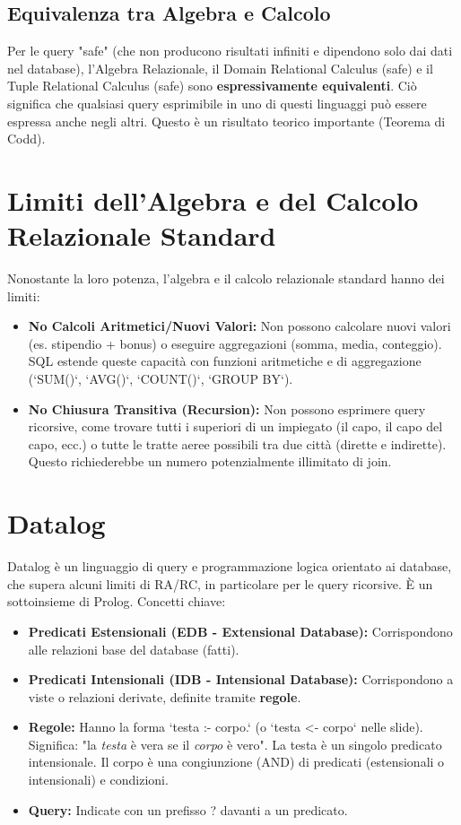 \documentclass{article}
\begin{document}
	\subsection{Equivalenza tra Algebra e Calcolo}
	Per le query "safe" (che non producono risultati infiniti e dipendono solo dai dati nel database), l'Algebra Relazionale, il Domain Relational Calculus (safe) e il Tuple Relational Calculus (safe) sono \textbf{espressivamente equivalenti}. Ciò significa che qualsiasi query esprimibile in uno di questi linguaggi può essere espressa anche negli altri. Questo è un risultato teorico importante (Teorema di Codd).
	
	\section{Limiti dell'Algebra e del Calcolo Relazionale Standard}
	Nonostante la loro potenza, l'algebra e il calcolo relazionale standard hanno dei limiti:
	\begin{itemize}
		\item \textbf{No Calcoli Aritmetici/Nuovi Valori:} Non possono calcolare nuovi valori (es. stipendio + bonus) o eseguire aggregazioni (somma, media, conteggio). SQL estende queste capacità con funzioni aritmetiche e di aggregazione (`SUM()`, `AVG()`, `COUNT()`, `GROUP BY`).
		\item \textbf{No Chiusura Transitiva (Recursion):} Non possono esprimere query ricorsive, come trovare tutti i superiori di un impiegato (il capo, il capo del capo, ecc.) o tutte le tratte aeree possibili tra due città (dirette e indirette). Questo richiederebbe un numero potenzialmente illimitato di join.
	\end{itemize}
	
	\section{Datalog}
	Datalog è un linguaggio di query e programmazione logica orientato ai database, che supera alcuni limiti di RA/RC, in particolare per le query ricorsive. È un sottoinsieme di Prolog.
	Concetti chiave:
	\begin{itemize}
		\item \textbf{Predicati Estensionali (EDB - Extensional Database):} Corrispondono alle relazioni base del database (fatti).
		\item \textbf{Predicati Intensionali (IDB - Intensional Database):} Corrispondono a viste o relazioni derivate, definite tramite \textbf{regole}.
		\item \textbf{Regole:} Hanno la forma `testa :- corpo.` (o `testa <- corpo` nelle slide).
		Significa: "la \textit{testa} è vera se il \textit{corpo} è vero".
		La testa è un singolo predicato intensionale. Il corpo è una congiunzione (AND) di predicati (estensionali o intensionali) e condizioni.
		\item \textbf{Query:} Indicate con un prefisso ? davanti a un predicato.
	\end{itemize}
	
\end{document}
